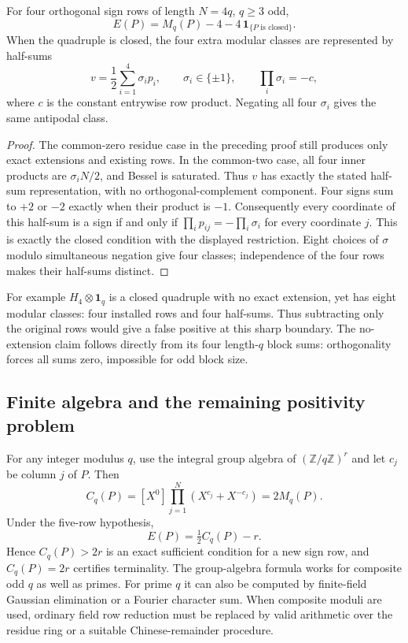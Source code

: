 \begin{proposition}
For four orthogonal sign rows of length $N=4q$, $q\ge3$ odd,
\[
 E(P)=M_q(P)-4-4\,\mathbf1_{\{P\text{ is closed}\}}.
\]
When the quadruple is closed, the four extra modular classes are
represented by half-sums
\[
 v=\frac12\sum_{i=1}^4\sigma_i p_i,
 \qquad\sigma_i\in\{\pm1\},\qquad
 \prod_i\sigma_i=-c,
\]
where $c$ is the constant entrywise row product. Negating all four
$\sigma_i$ gives the same antipodal class.
\end{proposition}
\begin{proof}
The common-zero residue case in the preceding proof still produces
only exact extensions and existing rows. In the common-two case,
all four inner products are $\sigma_iN/2$, and Bessel is saturated.
Thus $v$ has exactly the stated half-sum representation, with no
orthogonal-complement component. Four signs sum to $+2$ or $-2$
exactly when their product is $-1$. Consequently every coordinate
of this half-sum is a sign if and only if
$\prod_i p_{ij}=-\prod_i\sigma_i$ for every coordinate $j$.
This is exactly the closed condition with the displayed restriction.
Eight choices of $\sigma$ modulo simultaneous negation give four
classes; independence of the four rows makes their half-sums distinct.
\end{proof}

For example $H_4\otimes\mathbf1_q$ is a closed quadruple with no
exact extension, yet has eight modular classes: four installed rows
and four half-sums. Thus subtracting only the original rows would
give a false positive at this sharp boundary. The no-extension claim
follows directly from its four length-$q$ block sums: orthogonality
forces all sums zero, impossible for odd block size.

\subsection{Finite algebra and the remaining positivity problem}
For any integer modulus $q$, use the integral group algebra of
$(\mathbb Z/q\mathbb Z)^r$ and let $c_j$ be column $j$ of $P$.
Then
\[
 C_q(P)=[X^0]\prod_{j=1}^N(X^{c_j}+X^{-c_j})=2M_q(P).
\]
Under the five-row hypothesis,
\[
 \boxed{E(P)=\tfrac12C_q(P)-r.}
\]
Hence $C_q(P)>2r$ is an exact sufficient condition for a new sign row,
and $C_q(P)=2r$ certifies terminality. The group-algebra formula
works for composite odd $q$ as well as primes. For prime $q$ it can
also be computed by finite-field Gaussian elimination or a Fourier
character sum. When composite moduli are used, ordinary field row
reduction must be replaced by valid arithmetic over the residue ring
or a suitable Chinese-remainder procedure.

